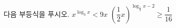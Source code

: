 다음 부등식을 푸시오.
 $x^{\log_3 x}<9x$
 $\left(\dfrac{1}{2}x\right)^{\log_{\frac{1}{2}} x-2}\ge\dfrac{1}{16}$
